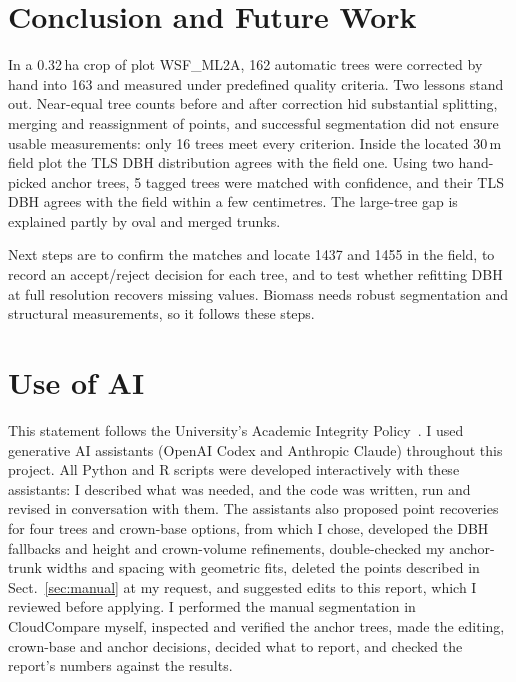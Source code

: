 \documentclass[runningheads]{llncs}
\begin{document}
\section{Conclusion and Future Work}\label{sec:conclusion}
In a 0.32\,ha crop of plot WSF\_ML2A, 162 automatic trees were corrected by hand into 163 and measured under predefined quality criteria. Two lessons stand out. Near-equal tree counts before and after correction hid substantial splitting, merging and reassignment of points, and successful segmentation did not ensure usable measurements: only 16 trees meet every criterion. Inside the located 30\,m field plot the TLS DBH distribution agrees with the field one. Using two hand-picked anchor trees, 5 tagged trees were matched with confidence, and their TLS DBH agrees with the field within a few centimetres. The large-tree gap is explained partly by oval and merged trunks.

Next steps are to confirm the matches and locate 1437 and 1455 in the field, to record an accept/reject decision for each tree, and to test whether refitting DBH at full resolution recovers missing values. Biomass needs robust segmentation and structural measurements, so it follows these steps.

\section*{Use of AI}
This statement follows the University's Academic Integrity Policy~\cite{info6003}. I used generative AI assistants (OpenAI Codex and Anthropic Claude) throughout this project. All Python and R scripts were developed interactively with these assistants: I described what was needed, and the code was written, run and revised in conversation with them. The assistants also proposed point recoveries for four trees and crown-base options, from which I chose, developed the DBH fallbacks and height and crown-volume refinements, double-checked my anchor-trunk widths and spacing with geometric fits, deleted the points described in Sect.~\ref{sec:manual} at my request, and suggested edits to this report, which I reviewed before applying. I performed the manual segmentation in CloudCompare myself, inspected and verified the anchor trees, made the editing, crown-base and anchor decisions, decided what to report, and checked the report's numbers against the results.
\end{document}
